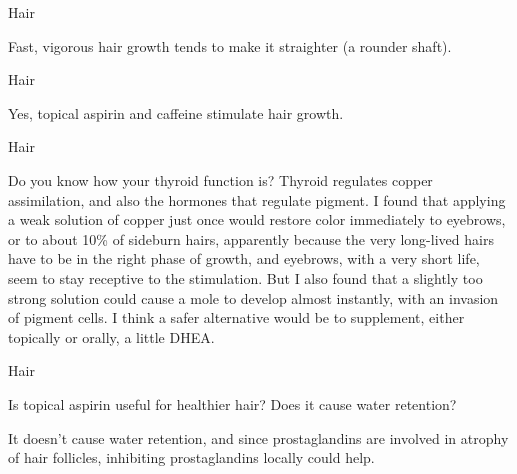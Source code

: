 \documentclass[11pt,oneside,openany,extrafontsizes]{memoir}
\begin{document}
\begin{standalonequote}{Hair}

    \begin{answer}
        Fast, vigorous hair growth tends to make it straighter (a rounder shaft).
    \end{answer}
\end{standalonequote}

\begin{standalonequote}{Hair}

    \begin{answer}
        Yes, topical aspirin and caffeine stimulate hair growth.
    \end{answer}
\end{standalonequote}

\begin{standalonequote}{Hair}

    \begin{answer}
        Do you know how your thyroid function is? Thyroid regulates copper assimilation, and also the hormones that regulate pigment. I found that applying a weak solution of copper just once would restore color immediately to eyebrows, or to about 10\% of sideburn hairs, apparently because the very long-lived hairs have to be in the right phase of growth, and eyebrows, with a very short life, seem to stay receptive to the stimulation. But I also found that a slightly too strong solution could cause a mole to develop almost instantly, with an invasion of pigment cells. I think a safer alternative would be to supplement, either topically or orally, a little DHEA.
    \end{answer}
\end{standalonequote}

\begin{qaexchange}{Hair}

    \begin{question}
        Is topical aspirin useful for healthier hair? Does it cause water retention?
    \end{question}

    \begin{answer}
        It doesn't cause water retention, and since prostaglandins are involved in atrophy of hair follicles, inhibiting prostaglandins locally could help.
    \end{answer}
\end{qaexchange}
\end{document}
